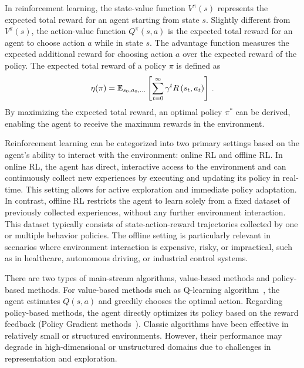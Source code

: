 In reinforcement learning, the state-value function $V^{\pi}(s)$ represents the expected total reward for an agent starting from state $s$. Slightly different from $V^{\pi}(s)$, the action-value function $Q^{\pi}(s, a)$ is the expected total reward for an agent to choose action $a$ while in state $s$. The advantage function measures the expected additional reward for choosing action $a$ over the expected reward of the policy.
The expected total reward of a policy $\pi$ is defined as 
% 
\begin{equation}
    \small
    \eta(\pi)=\mathbb{E}_{s_0, a_0, \ldots}\left[\sum_{t=0}^{\infty} \gamma^t R\left(s_t, a_t\right)\right] \, .
    \label{eq:expected_reward}
\end{equation}
By maximizing the expected total reward, an optimal policy $\pi^{*}$ can be derived, enabling the agent to receive the maximum rewards in the environment.


Reinforcement learning can be categorized into two primary settings based on the agent's ability to interact with the environment: online RL and offline RL. In online RL, the agent has direct, interactive access to the environment and can continuously collect new experiences by executing and updating its policy in real-time. This setting allows for active exploration and immediate policy adaptation. In contrast, offline RL restricts the agent to learn solely from a fixed dataset of previously collected experiences, without any further environment interaction. This dataset typically consists of state-action-reward trajectories collected by one or multiple behavior policies. The offline setting is particularly relevant in scenarios where environment interaction is expensive, risky, or impractical, such as in healthcare, autonomous driving, or industrial control systems.


There are two types of main-stream algorithms, \ie value-based methods and policy-based methods. For value-based methods such as Q-learning algorithm~\citep{watkins1992q}, the agent estimates $Q(s,a)$ and greedily chooses the optimal action. Regarding policy-based methods, the agent directly optimizes its policy based on the reward feedback (\eg Policy Gradient methods~\citep{sutton1999policy}). Classic algorithms have been effective in relatively small or structured environments. However, their performance may degrade in high-dimensional or unstructured domains due to challenges in representation and exploration.

